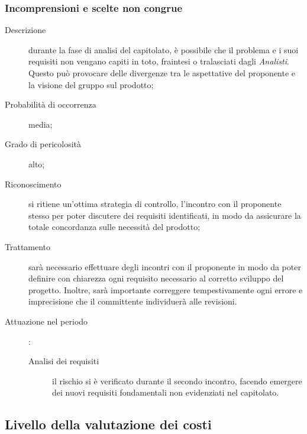 		\subsubsection{Incomprensioni e scelte non congrue}
		\begin{description}
			\item[Descrizione] durante la fase di analisi del capitolato, è possibile che il problema e i suoi requisiti non vengano capiti in toto, fraintesi o tralasciati dagli \emph{Analisti}. Questo può provocare delle divergenze tra le aspettative del proponente e la visione del gruppo sul prodotto;
			\item[Probabilità di occorrenza] media;
			\item[Grado di pericolosità] alto;
			\item[Riconoscimento] si ritiene un'ottima strategia di controllo, l'incontro con il proponente stesso per poter discutere dei requisiti identificati, in modo da assicurare la totale concordanza sulle necessità del prodotto;
			\item[Trattamento] sarà necessario effettuare degli incontri con il proponente in modo da poter definire con chiarezza ogni requisito necessario al corretto sviluppo del progetto. Inoltre, sarà importante correggere tempestivamente ogni errore e imprecisione che il committente individuerà alle revisioni. 
			\item[Attuazione nel periodo]:
			\begin{description}
				\item[Analisi dei requisiti] il rischio si è verificato durante il secondo incontro, facendo emergere dei nuovi requisiti fondamentali non evidenziati nel capitolato.
			\end{description}
		\end{description}
	\subsection{Livello della valutazione dei costi} \label{sec:val}
